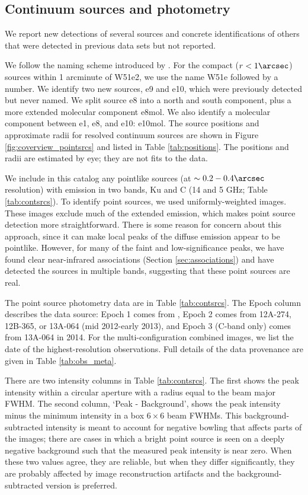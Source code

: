 \subsection{Continuum sources and photometry}
\label{sec:pointsources}
We report new detections of several sources and concrete
identifications of others that were detected in previous data sets but not
reported.

We follow the naming scheme introduced by \citet{Mehringer1994a}.  For the
compact ($r<1\arcsec$) sources within 1 arcminute of W51e2, we use the name
W51e followed by a number.  We identify two new sources, e9  and e10, which
were previously detected but never named.  We split source e8 into a north and
south component, plus a more extended molecular component e8mol.  We also
identify a molecular component between e1, e8, and e10: e10mol.  The source
positions and approximate radii for resolved continuum sources are shown in Figure
\ref{fig:coverview_pointsrcs} and listed in Table \ref{tab:positions}.
The positions and radii are estimated by eye; they are not fits to the data.



We include in this catalog any pointlike sources (at $\sim0.2-0.4\arcsec$
resolution) with emission in two bands, Ku and C (14 and 5 GHz; Table
\ref{tab:contsrcs}).  To identify point sources, we used uniformly-weighted
images.  These images exclude much of the extended emission, which makes point
source detection more straightforward.  There is some reason for concern about
this approach, since it can make local peaks of the diffuse emission appear to
be pointlike.  However, for many of the faint and low-significance peaks, we
have found clear near-infrared associations (Section \ref{sec:associations})
and have detected the sources in multiple bands, suggesting that these point
sources are real.

The point source photometry data are in Table \ref{tab:contsrcs}.  The Epoch column
describes the data source: Epoch 1 comes from \citet{Mehringer1994a}, Epoch 2
comes from 12A-274, 12B-365, or 13A-064 (mid 2012-early
2013), and Epoch 3 (C-band only) comes from
13A-064 in 2014. For the multi-configuration combined images, we list the date
of the highest-resolution observations.  Full details of the data provenance
are given in Table \ref{tab:obs_meta}.

There are two intensity columns in Table \ref{tab:contsrcs}.  The first shows
the peak intensity within a circular aperture with a radius equal to the beam
major FWHM.  The second column, `Peak - Background', shows the peak intensity
minus the minimum intensity in a box $6\times6$ beam FWHMs.  This
background-subtracted intensity is meant to account for negative bowling that
affects parts of the images; there are cases in which a bright point source is
seen on a deeply negative background such that the measured peak intensity is
near zero.  When these two values agree, they are reliable, but when they
differ significantly, they are probably affected by image reconstruction
artifacts and the background-subtracted version is preferred.

